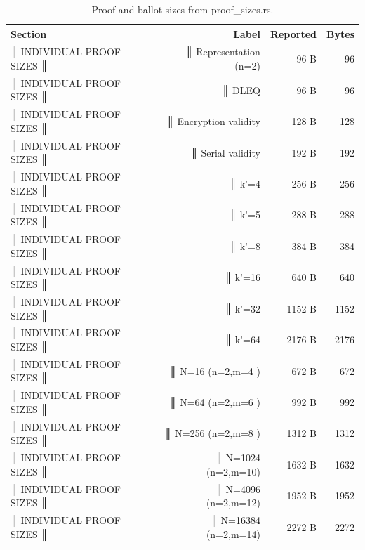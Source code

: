 \begin{table}[h]
  \centering
  \caption{Proof and ballot sizes from proof\_sizes.rs.}
  \label{tab:g2_proof_sizes}
  \begin{tabular}{lrrr}
    \toprule
    Section & Label & Reported & Bytes \\
    \midrule
║ INDIVIDUAL PROOF SIZES                                         ║ & ║  Representation (n=2) & 96 B & 96 \\
║ INDIVIDUAL PROOF SIZES                                         ║ & ║  DLEQ & 96 B & 96 \\
║ INDIVIDUAL PROOF SIZES                                         ║ & ║  Encryption validity & 128 B & 128 \\
║ INDIVIDUAL PROOF SIZES                                         ║ & ║  Serial validity & 192 B & 192 \\
║ INDIVIDUAL PROOF SIZES                                         ║ & ║  k'=4 & 256 B & 256 \\
║ INDIVIDUAL PROOF SIZES                                         ║ & ║  k'=5 & 288 B & 288 \\
║ INDIVIDUAL PROOF SIZES                                         ║ & ║  k'=8 & 384 B & 384 \\
║ INDIVIDUAL PROOF SIZES                                         ║ & ║  k'=16 & 640 B & 640 \\
║ INDIVIDUAL PROOF SIZES                                         ║ & ║  k'=32 & 1152 B & 1152 \\
║ INDIVIDUAL PROOF SIZES                                         ║ & ║  k'=64 & 2176 B & 2176 \\
║ INDIVIDUAL PROOF SIZES                                         ║ & ║  N=16         (n=2,m=4 ) & 672 B & 672 \\
║ INDIVIDUAL PROOF SIZES                                         ║ & ║  N=64         (n=2,m=6 ) & 992 B & 992 \\
║ INDIVIDUAL PROOF SIZES                                         ║ & ║  N=256        (n=2,m=8 ) & 1312 B & 1312 \\
║ INDIVIDUAL PROOF SIZES                                         ║ & ║  N=1024       (n=2,m=10) & 1632 B & 1632 \\
║ INDIVIDUAL PROOF SIZES                                         ║ & ║  N=4096       (n=2,m=12) & 1952 B & 1952 \\
║ INDIVIDUAL PROOF SIZES                                         ║ & ║  N=16384      (n=2,m=14) & 2272 B & 2272 \\

\end{tabular}
\end{table}
